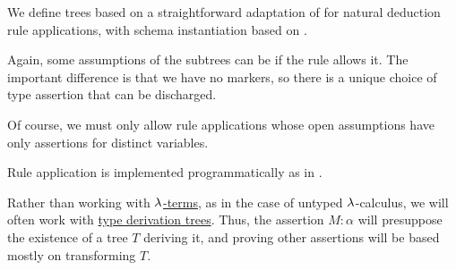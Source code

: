 \begin{definition}
\begin{thmenum}[resume=def:type_derivation_tree]
     We define  trees based on a straightforward adaptation of  for natural deduction rule applications, with schema instantiation based on .

    Again, some assumptions of the subtrees can be  if the rule allows it. The important difference is that we have no markers, so there is a unique choice of type assertion that can be discharged.

    Of course, we must only allow rule applications whose open assumptions have only assertions for distinct variables.
  \end{thmenum}
\end{definition}
\begin{comments}
  \item Rule application is implemented programmatically as  in \cite{notebook:code}.
\end{comments}

\begin{remark}\label{rem:type_derivation_tree_focus}
  Rather than working with \hyperref[def:lambda_term]{\( {\mathrm \lambda} \)-terms}, as in the case of untyped \( {\mathrm \lambda} \)-calculus, we will often work with \hyperref[def:type_derivation_tree]{type derivation trees}. Thus, the assertion \( M: \alpha \) will presuppose the existence of a tree \( T \) deriving it, and proving other assertions will be based mostly on transforming \( T \).
\end{remark}

